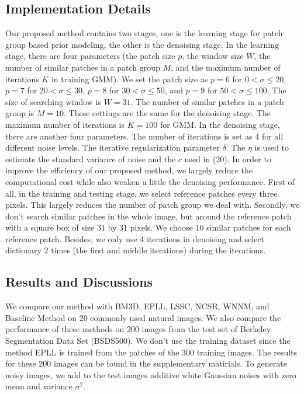 \documentclass[10pt,twocolumn,letterpaper]{article}
\begin{document}
\subsection{Implementation Details}
Our proposed method contains two stages, one is the learning stage for patch group based prior modeling, the other is the denoising stage. In the learning stage, there are four parameters (the patch size $p$, the window size $W$, the number of similar patches in a patch group $M$, and the maximum number of iterations $K$ in training GMM). We set the patch size as $p = 6$ for $0 < \sigma \le 20$, $p = 7$ for $20 < \sigma \le 30$, $p = 8$ for $30 < \sigma \le 50$, and $p=9$ for $50 < \sigma \le 100$. The size of searching window is $W = 31$. The number of similar patches in a patch group is $M = 10$. These settings are the same for the denoising stage. The maximum number of iterations is $K =100 $ for GMM. In the denoising stage, there are another four parameters. The number of iterations is set as 4 for all different noise levels. The iterative regularization parameter $\delta$. The $\eta$ is used to estimate the standard variance of noise and the $c$ used in (20). In order to improve the efficiency of our proposed method, we largely reduce the computational cost while also weaken a little the denoising performance. First of all, in the training and testing stage, we select reference patches every three pixels. This largely reduces the number of patch group we deal with. Secondly, we don't search similar patches in the whole image, but around the reference patch with a square box of size 31 by 31 pixels. We choose 10 similar patches for each reference patch. Besides, we only use 4 iterations in denoising and select dictionary 2 times (the first and middle iterations) during the iterations. 
\subsection{Results and Discussions}
We compare our method with BM3D, EPLL, LSSC, NCSR, WNNM, and Baseline Method on 20 commonly used natural images. We also compare the performance of these methods on 200 images from the test set of Berkeley Segmentation Data Set (BSDS500)\cite{bsds}. We don't use the training dataset since the method EPLL is trained from the patches of the 300 training images. The results for these 200 images can be found in the supplementary matirials. To generate noisy images, we add to the test images additive white Gaussian noises with zero mean and variance $\sigma^{2}$.
\end{document}
